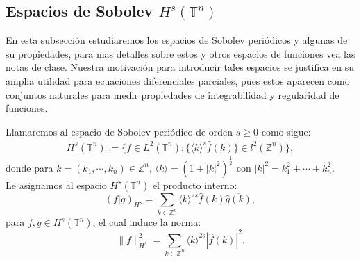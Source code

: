   \subsection{Espacios de Sobolev $H^s(\mathbb{T}^{n})$}
    En esta subsección estudiaremos los espacios de Sobolev periódicos y algunas de su propiedades, para mas detalles sobre estos y otros espacios de funciones vea las notas de clase. Nuestra motivación para introducir tales espacios se justifica en su amplia utilidad para ecuaciones diferenciales parciales, pues estos aparecen como conjuntos naturales para medir propiedades de integrabilidad y regularidad de funciones.\\
    \begin{definition}\label{definition:Hs-per}
      Llamaremos al espacio de Sobolev periódico de orden $s\geq 0$ como sigue:
      \begin{align*}
        H^s(\mathbb{T}^{n}):=\{f\in L^2(\mathbb{T}^{n}):\{\langle k \rangle^s\hat{f}(k)\}\in l^{2}(\mathbb{Z}^{n})\},
      \end{align*}
      donde para $k=(k_1,\cdots, k_n)\in\mathbb{Z}^{n}$, $\langle k \rangle=(1+|k|^2)^{\frac{1}{2}}$ con $|k|^2=k_1^2+\cdots+k_n^2$.\\
      Le asignamos al espacio $H^s(\mathbb{T}^{n})$ el producto interno:
      \begin{equation}
        (f|g)_{H^s}=\sum_{k\in\mathbb{Z}^{n}}\langle k \rangle^{2s}\hat{f}(k)\overline{\hat{g}(k)},\label{eq:prod-int-Hs}
      \end{equation}
      para $f,g\in H^s(\mathbb{T}^{n})$, el cual induce la norma:
      \begin{equation}
        \|f\|_{H^s}^2=\sum_{k\in\mathbb{Z}^{n}}\langle k \rangle^{2s}|\hat{f}(k)|^2.\label{eq:norma-Hs}
      \end{equation}
    \end{definition}
